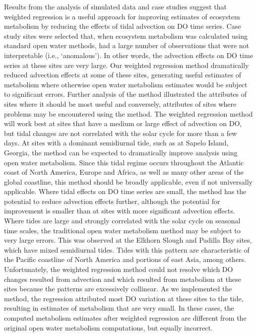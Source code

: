 \documentclass[letterpaper,12pt,oneside]{article}\usepackage[]{graphicx}\usepackage[]{color}
\begin{document}
Results from the analysis of simulated data and case studies suggest that weighted regression is a useful approach for improving estimates of ecosystem metabolism by reducing the effects of tidal advection on \ac{DO} time series.  Case study sites were selected that, when ecosystem metabolism was calculated using standard open water methods, had a large number of observations  that were not interpretable (i.e., `anomalous').  In other words, the advection effects on \ac{DO} time series at these sites are very large.  Our weighted regression method dramatically reduced advection effects at some of these sites, generating useful estimates of metabolism where otherwise open water metabolism estimates would be subject to significant errors.  Further analysis of the method illustrated the attributes of sites where it should be most useful and conversely, attributes of sites where problems may be encountered using the method.  The weighted regression method will work best at sites that have a medium or large effect of advection on \ac{DO}, but tidal changes are not correlated with the solar cycle for more than a few days.  At sites with a dominant semidiurnal tide, such as at Sapelo Island, Georgia, the method can be expected to dramatically improve analysis using open water metabolism.  Since this tidal regime occurs throughout the Atlantic coast of North America, Europe and Africa, as well as many other areas of the global coastline, this method should be broadly applicable, even if not universally applicable.  Where tidal effects on \ac{DO} time series are small, the method has the potential to reduce advection effects further, although the potential for improvement is smaller than at sites with more significant advection effects.  Where tides are large and strongly correlated with the solar cycle on seasonal time scales, the traditional open water metabolism method may be subject to very large errors.  This was observed at the Elkhorn Slough and Padilla Bay sites, which have mixed semidiurnal tides.  Tides with this pattern are characteristic of the Pacific coastline of North America and portions of east Asia, among others.  Unfortunately, the weighted regression method could not resolve which \ac{DO} changes resulted from advection and which resulted from metabolism at these sites because the patterns are excessively collinear.  As we implemented the method, the regression attributed most \ac{DO} variation at these sites to the tide, resulting in estimates of metabolism that are very small.  In these cases, the computed metabolism estimates after weighted regression are different from the original open water metabolism computations, but equally incorrect.
\end{document}
